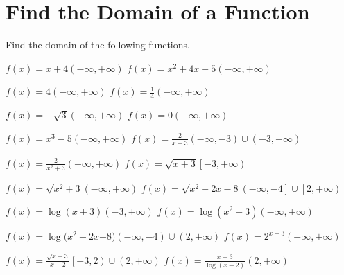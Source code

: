 \section{Find the Domain of a Function}
Find the domain of the following functions.

\pairofprobsans%
{$\displaystyle f\left(x\right)=x+4$}{$\displaystyle \left(-\infty, +\infty\right)$}
{$\displaystyle f\left(x\right)=x^2+4x + 5$}{$\displaystyle \left(-\infty, +\infty\right) $}

\pairofprobsans%
{$\displaystyle f\left(x\right)=4$}{$\displaystyle \left(-\infty, +\infty\right)$}
{$\displaystyle f\left(x\right)=\frac{1}{4}$}{$\displaystyle \left(-\infty, +\infty\right)$}

\pairofprobsans%
{$\displaystyle f\left(x\right)=-\sqrt{3}$}{$\displaystyle \left(-\infty, +\infty\right)$}
{$\displaystyle f\left(x\right)=0$}{$\displaystyle \left(-\infty, +\infty\right)$}

\pairofprobsans%
{$\displaystyle f\left(x\right)=x^3 - 5$}{$\displaystyle \left(-\infty, +\infty\right)$}
{$\displaystyle f\left(x\right)=\frac{2}{x+3}$}{$\displaystyle \left(-\infty, -3\right) \cup \left(-3, +\infty\right)$}

\pairofprobsans%
{$\displaystyle f\left(x\right)=\frac{2}{x^2+3}$}{$\displaystyle \left(-\infty, +\infty\right)$}
{$\displaystyle f\left(x\right)=\sqrt{x+3}$}{$\displaystyle \left[-3, +\infty\right)$}

\newpage

\pairofprobsans%
{$\displaystyle f\left(x\right)=\sqrt{x^2+3}$}{$\displaystyle \left(-\infty, +\infty\right)$}
{$\displaystyle f\left(x\right)=\sqrt{x^2+2x-8}$}{$\displaystyle \left(-\infty, -4\right] \cup \left[2, +\infty\right)$}

\pairofprobsans%
{$\displaystyle f\left(x\right)=\log{(x+3)}$}{$\displaystyle \left(-3, +\infty\right)$}
{$\displaystyle f\left(x\right)=\log{\left(x^2+3\right)}$}{$\displaystyle \left(-\infty, +\infty\right)$}

\pairofprobsans%
{$f\left(x\right)=\log{(x^2+2x}$$-8)$}{$\displaystyle \left(-\infty, -4\right) \cup \left(2, +\infty\right)$}
{$\displaystyle f\left(x\right)=2^{x+3}$}{$\displaystyle \left(-\infty, +\infty\right)$}

\pairofprobsans%
{$\displaystyle f\left(x\right)=\frac{\sqrt{x + 3}}{x-2}$}{$\displaystyle \left[-3, 2\right) \cup \left(2, +\infty\right)$}
{$\displaystyle f\left(x\right)=\frac{x + 3}{\log{(x-2)}}$}{$\displaystyle \left(2, +\infty\right)$}

